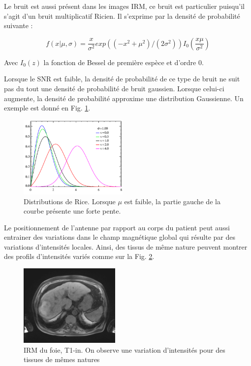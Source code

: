 Le bruit est aussi présent dans les images IRM, ce bruit est particulier puisqu'il s'agit d'un bruit multiplicatif Ricien. Il s'exprime par la densité de probabilité suivante : 

\begin{equation}
    f(x | \mu, \sigma) = \frac{x}{\sigma^2} exp ( (-x^2 + \mu^2)/(2\sigma^2) ) I_0 (\frac{x\mu}{\sigma^2})
    \end{equation}

Avec $I_0(z)$ la fonction de Bessel de première espèce et d'ordre 0. 

Lorsque le SNR est faible, la densité de probabilité de ce type de bruit ne suit pas du tout une densité de probabilité de bruit gaussien. Lorsque celui-ci augmente, la densité de probabilité approxime une distribution Gaussienne. Un exemple est donné en Fig. \ref{fig:MRI_Rice}.

\begin{figure}
    \centering
    \includegraphics[height=4cm]{Images/rice_PDF.png}
    \caption{Distributions de Rice. Lorsque $\mu$ est faible, la partie gauche de la courbe présente une forte pente.}
    \label{fig:MRI_Rice}
\end{figure}

Le positionnement de l'antenne par rapport au corps du patient peut aussi entrainer des variations dans le champ magnétique global qui résulte par des variations d'intensités locales. Ainsi, des tissus de même nature peuvent montrer des profils d'intensités variés comme sur la Fig. \ref{fig:MRI_variations}.

\begin{figure}
    \centering
    \includegraphics[height=4cm]{Images/MRI_field_variations.png}
    \caption{IRM du foie, T1-in. On observe une variation d'intensités pour des tissues de mêmes natures}
    \label{fig:MRI_variations}
\end{figure}

